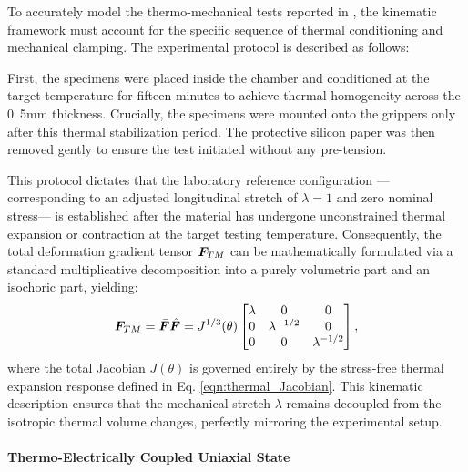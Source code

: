 To accurately model the thermo-mechanical tests reported in \cite{Liao_Mokarram2020,Alkhoury2022}, the kinematic framework must account for the specific sequence of thermal conditioning and mechanical clamping. The experimental protocol is described as follows:
\begin{displayquote}
  First, the specimens were placed inside the chamber and conditioned at the target temperature for fifteen minutes to achieve thermal homogeneity across the \si{0.5}{mm} thickness. Crucially, the specimens were mounted onto the grippers only after this thermal stabilization period. The protective silicon paper was then removed gently to ensure the test initiated without any pre-tension.  
\end{displayquote}
This protocol dictates that the laboratory reference configuration —corresponding to an adjusted longitudinal stretch of $\lambda=1$ and zero nominal stress— is established after the material has undergone unconstrained thermal expansion or contraction at the target testing temperature. 
Consequently, the total deformation gradient tensor $\boldsymbol{F}_{TM}$ can be mathematically formulated via a standard multiplicative decomposition into a purely volumetric part and an isochoric part, yielding:
\begin{equation}
    \label{eqn:F_thermo_mech}
    \boldsymbol{F}_{TM} = \bar{\boldsymbol{F}} \hat{\boldsymbol{F}} = J^{1/3}(\theta) \begin{bmatrix}
        \lambda & 0 & 0 \\
        0 & \lambda^{-1/2} & 0 \\
        0 & 0 & \lambda^{-1/2}
    \end{bmatrix},
\end{equation}
where the total Jacobian $J(\theta)$ is governed entirely by the stress-free thermal expansion response defined in Eq. \eqref{eqn:thermal_Jacobian}. This kinematic description ensures that the mechanical stretch $\lambda$ remains decoupled from the isotropic thermal volume changes, perfectly mirroring the experimental setup.


\paragraph{Thermo-Electrically Coupled Uniaxial State}

